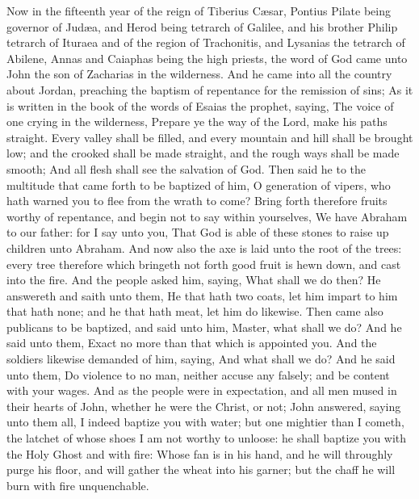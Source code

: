  Now in the fifteenth year of the reign of Tiberius Cæsar,
Pontius Pilate being governor of Judæa, and Herod being tetrarch of
Galilee, and his brother Philip tetrarch of Ituraea and of the region of
Trachonitis, and Lysanias the tetrarch of Abilene,  Annas
and Caiaphas being the high priests, the word of God came unto John the
son of Zacharias in the wilderness.  And he came into all
the country about Jordan, preaching the baptism of repentance for the
remission of sins;  As it is written in the book of the
words of Esaias the prophet, saying, The voice of one crying in the
wilderness, Prepare ye the way of the Lord, make his paths straight.
 Every valley shall be filled, and every mountain and hill
shall be brought low; and the crooked shall be made straight, and the
rough ways shall be made smooth;  And all flesh shall see
the salvation of God.  Then said he to the multitude that
came forth to be baptized of him, O generation of vipers, who hath
warned you to flee from the wrath to come?  Bring forth
therefore fruits worthy of repentance, and begin not to say within
yourselves, We have Abraham to our father: for I say unto you, That God
is able of these stones to raise up children unto Abraham.
 And now also the axe is laid unto the root of the trees:
every tree therefore which bringeth not forth good fruit is hewn down,
and cast into the fire.  And the people asked him,
saying, What shall we do then?  He answereth and saith
unto them, He that hath two coats, let him impart to him that hath none;
and he that hath meat, let him do likewise.  Then came
also publicans to be baptized, and said unto him, Master, what shall we
do?  And he said unto them, Exact no more than that which
is appointed you.  And the soldiers likewise demanded of
him, saying, And what shall we do? And he said unto them, Do violence to
no man, neither accuse any falsely; and be content with your wages.
 And as the people were in expectation, and all men mused
in their hearts of John, whether he were the Christ, or not;
 John answered, saying unto them all, I indeed baptize
you with water; but one mightier than I cometh, the latchet of whose
shoes I am not worthy to unloose: he shall baptize you with the Holy
Ghost and with fire:  Whose fan is in his hand, and he
will throughly purge his floor, and will gather the wheat into his
garner; but the chaff he will burn with fire unquenchable.
